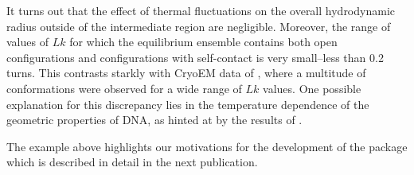 \documentclass{doctoral}
\newcommand{\code}[1]{\texttt{\detokenize{#1}}}
\begin{document}
It turns out that the effect of thermal fluctuations on the overall hydrodynamic radius outside of the intermediate region are negligible.
Moreover, the range of values of $Lk$ for which the equilibrium ensemble contains both open configurations and configurations with self-contact is very small--less than 0.2 turns.
This contrasts starkly with CryoEM data of  \textcite{Irobalieva_2015}, where a multitude of conformations were observed for a wide range of $Lk$ values.
One possible explanation for this discrepancy lies in the temperature dependence of the geometric properties of DNA, as hinted at by the results of \textcite{Ranasinghe_2023}.

The example above highlights our motivations for the development of the \code{pychastic} package which is described in detail in the next publication.
\clearpage
\end{document}
